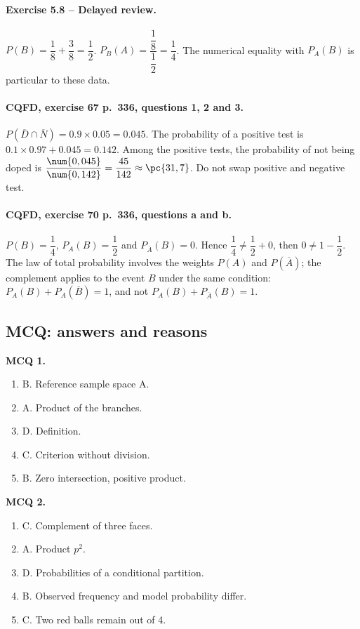 \paragraph{Exercise 5.8 -- Delayed review.} $P(B)=\dfrac{1}{8}+\dfrac{3}{8}=\dfrac{1}{2}$. $P_B(A)=\dfrac{\dfrac{1}{8}}{\dfrac{1}{2}}=\dfrac{1}{4}$. The numerical equality with $P_A(B)$ is particular to these data.
\paragraph{CQFD, exercise 67 p.~336, questions 1, 2 and 3.} $P(\overline D\cap\overline N)=\num{0,9}\times\num{0,05}=\num{0,045}$. The probability of a positive test is $\num{0,1}\times\num{0,97}+\num{0,045}=\num{0,142}$. Among the positive tests, the probability of not being doped is $\dfrac{\num{0,045}}{\num{0,142}}=\dfrac{45}{142}\approx\pc{31,7}$. Do not swap positive and negative test.
\paragraph{CQFD, exercise 70 p.~336, questions a and b.} $P(B)=\dfrac14$, $P_A(B)=\dfrac12$ and $P_{\overline A}(B)=0$. Hence $\dfrac14\ne\dfrac12+0$, then $0\ne1-\dfrac12$. The law of total probability involves the weights $P(A)$ and $P(\overline A)$; the complement applies to the event $B$ under the same condition: $P_A(B)+P_A(\overline B)=1$, and not $P_A(B)+P_{\overline A}(B)=1$.
\subsection*{MCQ: answers and reasons}
\textbf{MCQ 1.}
\begin{enumerate}
\item B. Reference sample space A.
\item A. Product of the branches.
\item D. Definition.
\item C. Criterion without division.
\item B. Zero intersection, positive product.
\end{enumerate}
\textbf{MCQ 2.}
\begin{enumerate}
\item C. Complement of three faces.
\item A. Product $p^2$.
\item D. Probabilities of a conditional partition.
\item B. Observed frequency and model probability differ.
\item C. Two red balls remain out of 4.
\end{enumerate}
